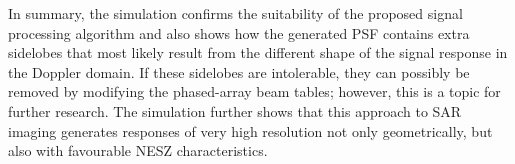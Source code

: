 \par
In summary, the simulation confirms the suitability of the proposed signal processing algorithm and also shows how the generated PSF contains extra sidelobes that most likely result from the different shape of the signal response in the Doppler domain. If these sidelobes are intolerable, they can possibly be removed by modifying the phased-array beam tables; however, this is a topic for further research. The simulation further shows that this approach to SAR imaging generates responses of very high resolution not only geometrically, but also with favourable NESZ characteristics.
\clearpage
%
